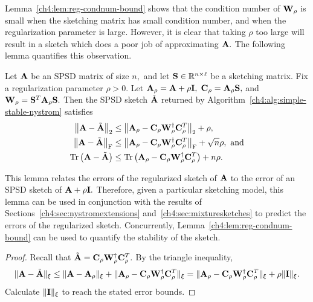 Lemma~\ref{ch4:lem:reg-condnum-bound} shows that the condition number of $\mathbf{W}_\rho$ is small when the sketching matrix
has small condition number, and when the regularization parameter is large. However, it is clear that taking
$\rho$ too large will result in a sketch which does a poor job of approximating 
$\mathbf{A}.$ The following lemma quantifies this observation.

\begin{lemma}
 Let $\mathbf{A}$ be an SPSD matrix of size $n,$ and let 
 $\mathbf{S} \in \mathbb{R}^{n \times \ell}$ be a sketching matrix. Fix a
 regularization parameter $\rho > 0.$ Let 
 $\mathbf{A}_\rho = \mathbf{A} + \rho \mathbf{I},$ $\mathbf{C}_\rho = \mathbf{A}_\rho \mathbf{S},$
 and $\mathbf{W}_\rho = \mathbf{S}^T \mathbf{A}_\rho \mathbf{S}.$ Then the SPSD sketch $\tilde{\mathbf{A}}$ returned by 
 Algorithm~\ref{ch4:alg:simple-stable-nystrom} satisfies 
 \begin{align*}
 \left\|\mathbf{A} - \tilde{\mathbf{A}}\right\|_2 & \leq \left\|\mathbf{A}_\rho - \mathbf{C}_\rho \mathbf{W}_\rho^\dagger \mathbf{C}_\rho^T\right\|_2 + \rho, \\
 \left\|\mathbf{A} - \tilde{\mathbf{A}}\right\|_\mathrm{F} & \leq \left\|\mathbf{A}_\rho - \mathbf{C}_\rho \mathbf{W}_\rho^\dagger \mathbf{C}_\rho^T\right\|_\mathrm{F} + \sqrt{n} \rho, \text{ and} \\
 \operatorname{Tr}\left(\mathbf{A} - \tilde{\mathbf{A}}\right) & \leq \operatorname{Tr}\left(\mathbf{A}_\rho - \mathbf{C}_\rho \mathbf{W}_\rho^\dagger \mathbf{C}_\rho^T\right) + n \rho. \\
 \end{align*}
\end{lemma}


 This lemma relates the errors of the regularized sketch of $\mathbf{A}$ to the error of an SPSD sketch of $\mathbf{A} + \rho \mathbf{I}.$
 Therefore, given a particular sketching model, this lemma can be used in conjunction with the results of 
 Sections~\ref{ch4:sec:nystromextensions}
 and~\ref{ch4:sec:mixturesketches} to predict the errors of the regularized sketch. Concurrently,
 Lemma~\ref{ch4:lem:reg-condnum-bound} can be used to quantify the stability of the sketch.
 
 \begin{proof}
  Recall that $\tilde{\mathbf{A}} = \mathbf{C}_\rho \mathbf{W}_\rho^\dagger \mathbf{C}_\rho^T.$
  By the triangle inequality,
  \[
   \mbox{}\|\mathbf{A} - \tilde{\mathbf{A}}\|_{\xi} \leq \mbox{}\|\mathbf{A} - \mathbf{A}_\rho\|_{\xi} + \mbox{}\|\mathbf{A}_\rho - \mathbf{C}_\rho \mathbf{W}_\rho^\dagger \mathbf{C}_\rho^T\|_{\xi}
    = \mbox{}\|\mathbf{A}_\rho - \mathbf{C}_\rho \mathbf{W}_\rho^\dagger \mathbf{C}_\rho^T\|_{\xi} + \rho \mbox{}\|\mathbf{I}\|_{\xi}.
  \]
  Calculate $\mbox{}\|\mathbf{I}\|_{\xi}$ to reach the stated error bounds.
 \end{proof}

